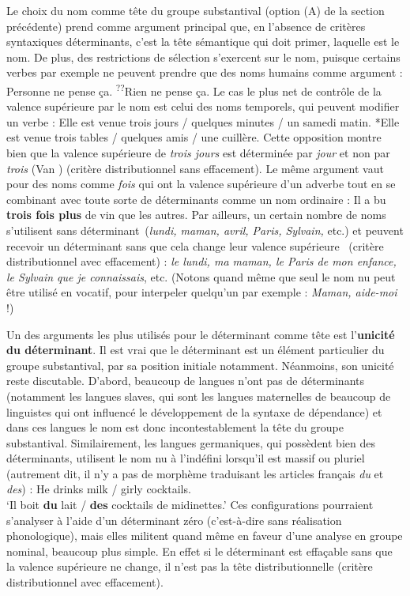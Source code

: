 Le choix du nom comme tête du groupe substantival (option (A) de la section précédente) prend comme argument principal que, en l’absence de critères syntaxiques déterminants, c’est la tête sémantique qui doit primer, laquelle est le nom. De plus, des restrictions de sélection s’exercent sur le nom, puisque certains verbes par exemple ne peuvent prendre que des noms humains comme argument :
\ea
    {Personne ne pense ça.}
\z
\ea
    \textsuperscript{??}{Rien ne pense ça.}
\z
Le cas le plus net de contrôle de la valence supérieure par le nom est celui des noms temporels, qui peuvent modifier un verbe :
\ea
    {Elle est venue trois jours /} {quelques minutes /} {un samedi matin.}
\z
\ea
    *{Elle est venue trois tables /} {quelques amis /} {une cuillère.}
\z
Cette opposition montre bien que la valence supérieure de \textit{trois jours} est déterminée par \textit{jour} et non par \textit{trois} (Van \citealt{Langendonck1994}) (critère distributionnel sans effacement). Le même argument vaut pour des noms comme \textit{fois} qui ont la valence supérieure d’un adverbe tout en se combinant avec toute sorte de déterminants comme un nom ordinaire :
\ea
    {Il a bu} \textbf{{trois fois plus}} {de vin que les autres}.
\z
Par ailleurs, un certain nombre de noms s’utilisent sans déterminant~(\textit{lundi, maman, avril, Paris, Sylvain,} etc.) et peuvent recevoir un déterminant sans que cela change leur valence supérieure~ (critère distributionnel avec effacement) : \textit{le lundi, ma maman, le Paris de mon enfance, le Sylvain que je connaissais}, etc. (Notons quand même que seul le nom nu peut être utilisé en vocatif, pour interpeler quelqu’un par exemple : \textit{Maman, aide-moi} !)

Un des arguments les plus utilisés pour le déterminant comme tête est l’\textbf{unicité du déterminant}. Il est vrai que le déterminant est un élément particulier du groupe substantival, par sa position initiale notamment. Néanmoins, son unicité reste discutable. D’abord, beaucoup de langues n’ont pas de déterminants (notamment les langues slaves, qui sont les langues maternelles de beaucoup de linguistes qui ont influencé le développement de la syntaxe de dépendance) et dans ces langues le nom est donc incontestablement la tête du groupe substantival. Similairement, les langues germaniques, qui possèdent bien des déterminants, utilisent le nom nu à l’indéfini lorsqu’il est massif ou pluriel (autrement dit, il n’y a pas de morphème traduisant les articles français \textit{du} et \textit{des}) :
\ea
{He drinks milk / girly cocktails.}\\
\glt ‘Il boit \textbf{du} lait / \textbf{des} cocktails de midinettes.’
\z
Ces configurations pourraient s’analyser à l’aide d’un déterminant zéro (c’est-à-dire sans réalisation phonologique), mais elles militent quand même en faveur d’une analyse en groupe nominal, beaucoup plus simple. En effet si le déterminant est effaçable sans que la valence supérieure ne change, il n’est pas la tête distributionnelle (critère distributionnel avec effacement).

